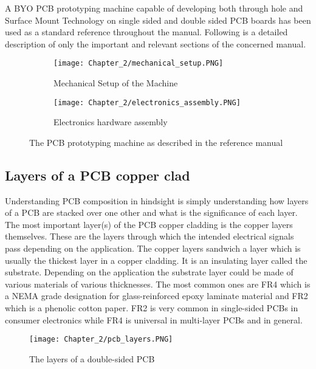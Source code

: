 A BYO PCB prototyping machine capable of developing both through hole and Surface Mount Technology on single sided and double sided PCB boards has been used as a standard reference throughout the manual. Following is a detailed description of  only the important and relevant sections of the concerned manual.


\begin{figure}[h]

 \begin{subfigure}{0.5\textwidth}
  \texttt{[image: Chapter\_2/mechanical\_setup.PNG]}
  \caption{Mechanical Setup of the Machine}
  \label{fig:subim1}
 \end{subfigure}
 \begin{subfigure}{0.5\textwidth}
  \texttt{[image: Chapter\_2/electronics\_assembly.PNG]}
  \caption{Electronics hardware assembly}
  \label{fig:subim2}
 \end{subfigure}

 \caption{The PCB prototyping machine as described in the reference manual}
 \label{fig:paper_cnc_machine}
\end{figure}


\subsection{Layers of a PCB copper clad}

Understanding PCB composition in hindsight is simply understanding how layers of a PCB are stacked over one other and what is the significance of each layer. The most important layer(s) of the PCB copper cladding is the copper layers themselves. These are the layers through which the intended electrical signals pass depending on the application. The copper layers sandwich a layer which is usually the thickest layer in a copper cladding. It is an insulating layer called the substrate. Depending on the application the substrate layer could be made of various materials of various thicknesses. The most common ones are FR4 which is a NEMA grade designation for glass-reinforced epoxy laminate material and FR2 which is a phenolic cotton paper. FR2 is very common in single-sided PCBs in consumer electronics while FR4 is universal in multi-layer PCBs and in general. \par


\begin{figure}[h]
 \centering
 \texttt{[image: Chapter\_2/pcb\_layers.PNG]}
 \caption{The layers of a double-sided PCB}
 \label{fig:pcb_layers}
\end{figure}

